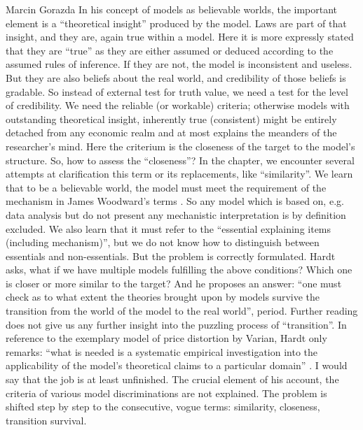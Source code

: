 \begin{recengenv}{Marcin Gorazda}
In his concept of models as believable worlds, the important element is a ``theoretical insight'' produced by the model.
Laws are part of that insight, and they are, again true within a model. Here it is more expressly stated that they are
``true'' as they are either assumed or deduced according to the assumed rules of inference. If they are not, the model is
inconsistent and useless. But they are also beliefs about the real world, and credibility of those beliefs is gradable.
So instead of external test for truth value, we need a test for the level of credibility. We need the reliable (or
workable) criteria; otherwise models with outstanding theoretical insight, inherently true (consistent) might be
entirely detached from any economic realm and at most explains the meanders of the researcher’s mind. Here the
criterium is the closeness of the target to the model’s structure. So, how to assess the ``closeness''? In the chapter,
we encounter several attempts at clarification this term or its replacements, like ``similarity''. We learn that to be a
believable world, the model must meet the requirement of the mechanism in James Woodward’s terms
\parencite{woodward_what_2002}.
So any model which is based on, e.g. data analysis but do not present any
mechanistic interpretation is by definition excluded. We also learn that it must refer to the ``essential explaining
items (including mechanism)'', but we do not know how to distinguish between essentials and non-essentials. But the
problem is correctly formulated. Hardt asks, what if we have multiple models fulfilling the above conditions? Which one
is closer or more similar to the target? And he proposes an answer: ``\mydots one must check as to what extent the theories
brought upon by models survive the transition from the world of the model to the real world'', period. Further reading
does not give us any further insight into the puzzling process of ``transition''. In reference to the exemplary model of
price distortion by Varian, Hardt only remarks: ``\mydots what is needed is a systematic empirical investigation into the
applicability of the model’s theoretical claims to a particular domain''
\parencite[p.154]{hardt_economics_2017}.
I would say that the job is at least unfinished. The crucial element of his account, the criteria of various model
discriminations are not explained. The problem is shifted step by step to the consecutive, vogue terms: similarity,
closeness, transition survival. 


\end{recengenv}
